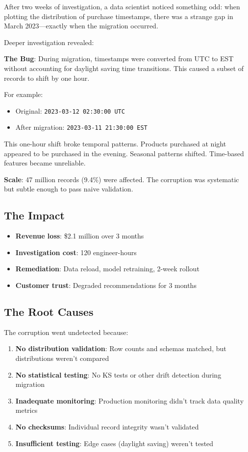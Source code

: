 After two weeks of investigation, a data scientist noticed something odd: when plotting the distribution of purchase timestamps, there was a strange gap in March 2023---exactly when the migration occurred.

Deeper investigation revealed:

\textbf{The Bug}: During migration, timestamps were converted from UTC to EST without accounting for daylight saving time transitions. This caused a subset of records to shift by one hour.

For example:
\begin{itemize}
    \item Original: \texttt{2023-03-12 02:30:00 UTC}
    \item After migration: \texttt{2023-03-11 21:30:00 EST}
\end{itemize}

This one-hour shift broke temporal patterns. Products purchased at night appeared to be purchased in the evening. Seasonal patterns shifted. Time-based features became unreliable.

\textbf{Scale}: 47 million records (9.4\%) were affected. The corruption was systematic but subtle enough to pass naive validation.

\subsection{The Impact}

\begin{itemize}
    \item \textbf{Revenue loss}: \$2.1 million over 3 months
    \item \textbf{Investigation cost}: 120 engineer-hours
    \item \textbf{Remediation}: Data reload, model retraining, 2-week rollout
    \item \textbf{Customer trust}: Degraded recommendations for 3 months
\end{itemize}

\subsection{The Root Causes}

The corruption went undetected because:

\begin{enumerate}
    \item \textbf{No distribution validation}: Row counts and schemas matched, but distributions weren't compared
    \item \textbf{No statistical testing}: No KS tests or other drift detection during migration
    \item \textbf{Inadequate monitoring}: Production monitoring didn't track data quality metrics
    \item \textbf{No checksums}: Individual record integrity wasn't validated
    \item \textbf{Insufficient testing}: Edge cases (daylight saving) weren't tested
\end{enumerate}

